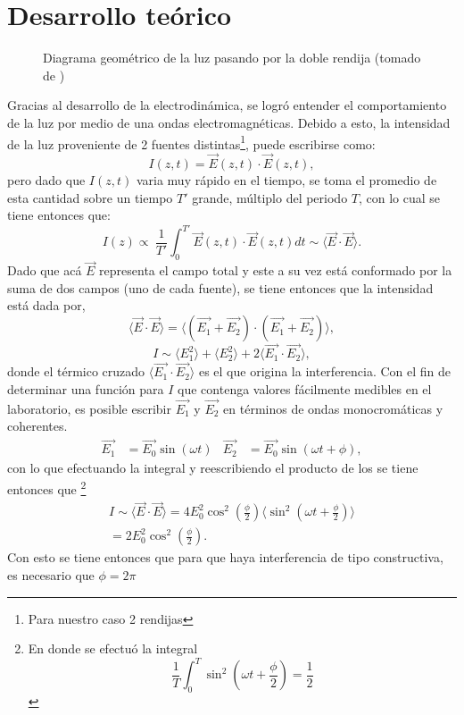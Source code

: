 \documentclass[%
 reprint,
 amsmath,amssymb,
 aps,
]{revtex4-1}
\begin{document}
\section{Desarrollo teórico}
\begin{figure}[h]
\caption{\label{doble rendija} Diagrama geométrico de la luz pasando por la doble rendija (tomado de \cite{MIT})}
\end{figure}
Gracias al desarrollo de la electrodinámica, se logró entender el comportamiento de la luz por medio de una ondas electromagnéticas. Debido a esto, la intensidad de la luz proveniente de 2 fuentes distintas\footnote{Para nuestro caso 2 rendijas}, puede escribirse como:
\[I(z,t)=\vec{E}(z,t)\cdot \vec{E}(z,t),\]
pero dado que $I(z,t)$ varia muy rápido en el tiempo, se toma el promedio de esta cantidad sobre un tiempo $T'$ grande, múltiplo del periodo $T$, con lo cual se tiene entonces que:
\[I(z)\propto\ \frac{1}{T'}\int_{0}^{T'}\vec{E}(z,t)\cdot \vec{E}(z,t) dt \sim \langle \vec{E}\cdot \vec{E}\rangle.\]
Dado que acá $\vec{E}$ representa el campo total y este a su vez está conformado por la suma de dos campos (uno de cada fuente), se tiene entonces que la intensidad está dada por,
\begin{equation*}
  \langle \vec{E}\cdot \vec{E}\rangle = \langle (\vec{E_1}+\vec{E_2})\cdot (\vec{E_1}+\vec{E_2})\rangle,
\end{equation*}
\begin{equation}
I\sim \langle E_1^2\rangle+\langle E_2^2\rangle+2\langle \vec{E_1}\cdot  \vec{E_2}\rangle,
\label{difraccion}
\end{equation}
donde el térmico cruzado $\langle \vec{E_1}\cdot  \vec{E_2}\rangle$ es el que origina la interferencia. Con el fin de determinar una función para $I$ que contenga valores fácilmente medibles en el laboratorio, es posible escribir $\vec{E_1}$ y $\vec{E_2}$ en términos de ondas monocromáticas y coherentes.
\begin{align}
\vec{E_1}&=\vec{E_0}\sin(\omega t)   &  \vec{E_2}&=\vec{E_0}\sin(\omega t+ \phi),
\label{campos electricos}
\end{align}
con lo que efectuando la integral y reescribiendo el producto de los  se tiene entonces que \footnote{En donde se efectuó la integral
\[ \frac{1}{T}\int_{0}^{T}\sin^2\left(\omega t+\frac{\phi}{2}\right)=\frac{1}{2}\]
}
\begin{multline}
I\sim  \langle \vec{E}\cdot \vec{E}\rangle = 4E_0^2 \cos^2\left(\frac{\phi}{2}\right)\langle\sin^2\left(\omega t+\frac{\phi}{2}\right)\rangle \\
=2E_0^2\cos^2\left(\frac{\phi}{2}\right).
\end{multline}
Con esto se tiene entonces que para que haya interferencia de tipo constructiva, es necesario que $\phi=2\pi$
\end{document}

